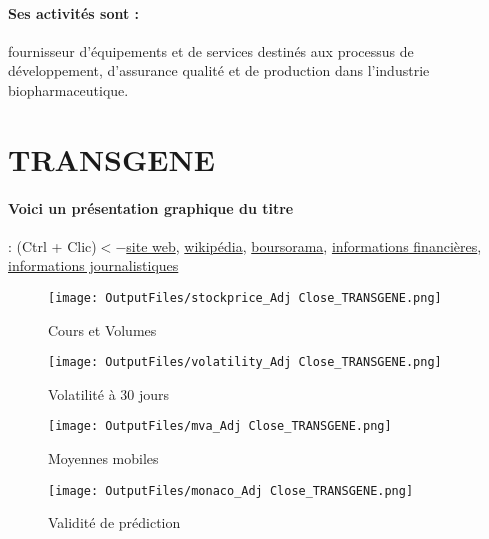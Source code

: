 \documentclass[11pt,a4paper]{report}%
\begin{document}
\paragraph{Ses activités sont : } fournisseur d’équipements et de services destinés aux processus de développement, d’assurance qualité et de production dans l’industrie biopharmaceutique.  
    
    \newpage

\section{TRANSGENE}

\paragraph{Voici un présentation graphique du titre} : (Ctrl + Clic)$<-$\href{https://www.transgene.fr/investisseurs/}{site web}, \href{https://fr.wikipedia.org/wiki/Transgene_(entreprise)}{wikipédia}, \href{https://www.boursorama.com/cours/1rPTNG}{boursorama}, \href{https://www.qwant.com/?q=site:https:%2f%2fwww.easybourse.com%2faction-societe%2fTRANSGENE&t=web&client=ext-firefox-hp}{informations financières}, \href{https://bourse.lerevenu.com/cours-de-bourse/fiche-valeur-synthese/TRANSGENE/TNG-FR}{informations journalistiques}
\begin{figure}[!htb]
   \begin{minipage}{0.5\textwidth}
     \centering
     \texttt{[image: OutputFiles/stockprice\_Adj Close\_TRANSGENE.png]}
     \caption{Cours et Volumes}\label{Fig:price_TRANSGENE}
   \end{minipage}\hfill
   \begin{minipage}{0.5\textwidth}
     \centering
     \texttt{[image: OutputFiles/volatility\_Adj Close\_TRANSGENE.png]}
     \caption{Volatilité à 30 jours}\label{Fig:volat_TRANSGENE}
   \end{minipage}
\end{figure}
\begin{figure}[!htb]
   \begin{minipage}{0.5\textwidth}
     \centering
     \texttt{[image: OutputFiles/mva\_Adj Close\_TRANSGENE.png]}
     \caption{Moyennes mobiles}\label{Fig:mva_TRANSGENE}
   \end{minipage}\hfill
   \begin{minipage}{0.5\textwidth}
     \centering
     \texttt{[image: OutputFiles/monaco\_Adj Close\_TRANSGENE.png]}
     \caption{Validité de prédiction}\label{Fig:prediction_TRANSGENE}
   \end{minipage}
\end{figure}
\end{document}
